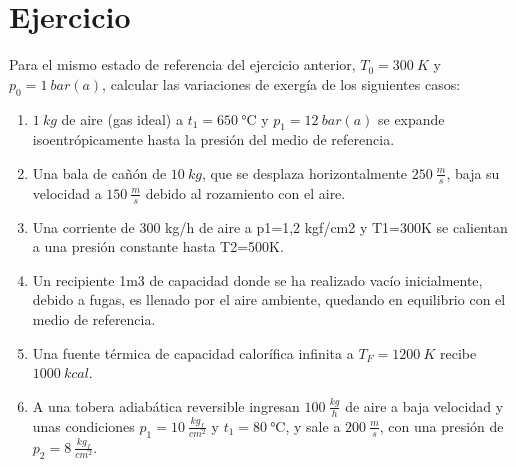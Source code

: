 \section{Ejercicio}\label{ej:Chap08Ejercicio03}


Para el mismo estado de referencia del ejercicio anterior, $T_0=\SI{300}{K}$ y $p_0=\SI{1}{bar(a)}$, calcular las variaciones de exergía de los siguientes casos:
\begin{enumerate}
    \item $\SI{1}{kg}$ de aire (gas ideal) a $t_1=\SI{650}{\celsius}$ y $p_1=\SI{12}{bar(a)}$ se expande isoentrópicamente hasta la presión del medio de referencia.
    \item Una bala de cañón de $\SI{10}{kg}$, que se desplaza horizontalmente $\SI{250}{\frac{m}{s}}$, baja su velocidad a $\SI{150}{\frac{m}{s}}$ debido al rozamiento con el aire.
    \item Una corriente de 300 kg/h de aire a p1=1,2 kgf/cm2 y T1=300K se calientan a una presión constante hasta T2=500K.
    \item Un recipiente 1m3 de capacidad donde se ha realizado vacío inicialmente, debido a fugas, es llenado por el aire ambiente, quedando en equilibrio con el medio de referencia.
    \item Una fuente térmica de capacidad calorífica infinita a $T_F=\SI{1200}{K}$ recibe $\SI{1000}{kcal}$.
    \item A una tobera adiabática reversible ingresan $\SI{100}{\frac{kg}{h}}$ de aire a baja velocidad y unas condiciones $p_1=\SI{10}{\frac{kg_f}{cm^2}}$ y $t_1=\SI{80}{\celsius}$, y sale a $\SI{200}{\frac{m}{s}}$, con una presión de $p_2=\SI{8}{\frac{kg_f}{cm^2}}$.
\end{enumerate}